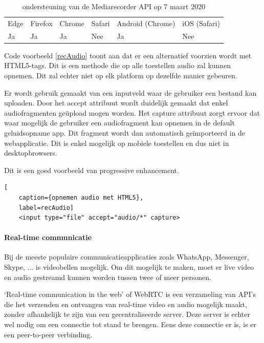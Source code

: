 	
	
	\begin{table}[H]
		\centering
		\begin{tabular}{llllll}
			Edge & Firefox & Chrome & Safari & Android (Chrome) & iOS (Safari) \\
			Ja   & Ja      & Ja     & Nee     & Ja               & Nee          
		\end{tabular}	
		\caption{ondersteuning van de Mediarecorder API op 7 maart 2020}
	\end{table}
	
	Code voorbeeld \ref{recAudio} toont aan dat er een alternatief voorzien wordt met HTML5-tags. Dit is een methode die op alle toestellen audio zal kunnen opnemen. Dit zal echter niet op elk platform op dezelfde manier gebeuren.
	
	Er wordt gebruik gemaakt van een inputveld waar de gebruiker een bestand kan uploaden. Door het accept attribuut wordt duidelijk gemaakt dat enkel audiofragmenten geüpload mogen worden. Het capture attribuut zorgt ervoor dat waar mogelijk de gebruiker een audiofragment kan opnemen in de default geluidsopname app. Dit fragment wordt dan automatisch geïmporteerd in de webapplicatie. Dit is enkel mogelijk op mobiele toestellen en dus niet in desktopbrowsers.
	\autocite{Kinlan2019}
	
	Dit is een goed voorbeeld van progressive enhancement. 
	
	\begin{lstlisting}[
	caption={opnemen audio met HTML5},
	label=recAudio]
	<input type="file" accept="audio/*" capture>
	\end{lstlisting}
	
	
	
	\paragraph{Real-time communicatie }
	
	Bij de meeste populaire communicatieapplicaties zoals WhatsApp, Messenger, Skype, ... is videobellen mogelijk. Om dit mogelijk te maken, moet er live video en audio gestreamd kunnen worden tussen twee of meer personen.
	
	‘Real-time communication in the web’ of WebRTC \autocite{Jennings2019} is een verzameling van API's die het verzenden en ontvangen van real-time video en audio mogelijk maakt, zonder afhankelijk te zijn van een gecentraliseerde server. Deze server is echter wel nodig om een connectie tot stand te brengen. Eens deze connectie er is, is er een peer-to-peer verbinding.
	
